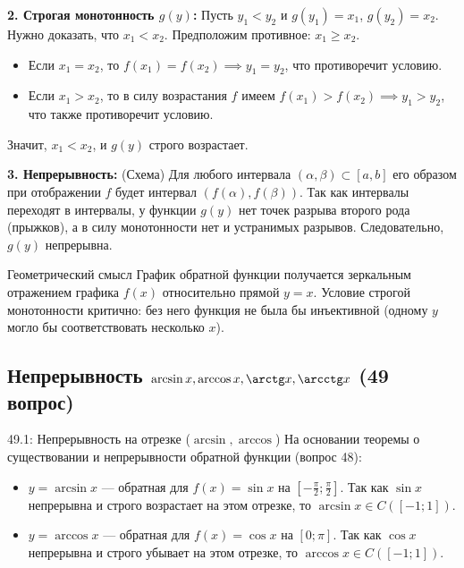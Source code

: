 \documentclass[a4paper,12pt]{article}
\begin{document}
	\vspace{0.5cm}
	\textbf{2. Строгая монотонность $g(y)$:}
	Пусть $y_1 < y_2$ и $g(y_1) = x_1$, $g(y_2) = x_2$. Нужно доказать, что $x_1 < x_2$.
	Предположим противное: $x_1 \geq x_2$.
	\begin{itemize}
		\item Если $x_1 = x_2$, то $f(x_1) = f(x_2) \implies y_1 = y_2$, что противоречит условию.
		\item Если $x_1 > x_2$, то в силу возрастания $f$ имеем $f(x_1) > f(x_2) \implies y_1 > y_2$, что также противоречит условию.
	\end{itemize}
	Значит, $x_1 < x_2$, и $g(y)$ строго возрастает.
	
	\vspace{0.5cm}
	\textbf{3. Непрерывность:} (Схема)
	Для любого интервала $(\alpha, \beta) \subset [a, b]$ его образом при отображении $f$ будет интервал $(f(\alpha), f(\beta))$. Так как интервалы переходят в интервалы, у функции $g(y)$ нет точек разрыва второго рода (прыжков), а в силу монотонности нет и устранимых разрывов. Следовательно, $g(y)$ непрерывна.
	
	\vspace{0.5cm}
	\begin{importantbox}{Геометрический смысл}
		График обратной функции получается зеркальным отражением графика $f(x)$ относительно прямой $y = x$. Условие строгой монотонности критично: без него функция не была бы инъективной (одному $y$ могло бы соответствовать несколько $x$).
	\end{importantbox}
	
	
	
	
	
	
	\newpage
	\subsection{Непрерывность $\arcsin x, \arccos x, \arctg x, \arcctg x$ (49 вопрос)}
	
	\begin{theorembox}{{49.1: Непрерывность на отрезке ($\arcsin, \arccos$)}}
		На основании теоремы о существовании и непрерывности обратной функции (вопрос 48):
		\begin{itemize}
			\item $y = \arcsin x$ — обратная для $f(x) = \sin x$ на $[-\frac{\pi}{2}; \frac{\pi}{2}]$. Так как $\sin x$ непрерывна и строго возрастает на этом отрезке, то $\arcsin x \in C([-1; 1])$.
			\item $y = \arccos x$ — обратная для $f(x) = \cos x$ на $[0; \pi]$. Так как $\cos x$ непрерывна и строго убывает на этом отрезке, то $\arccos x \in C([-1; 1])$.
		\end{itemize}
	\end{theorembox}
	
\end{document}
